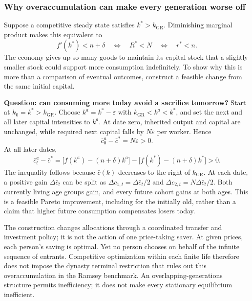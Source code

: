 \subsubsection{Why overaccumulation can make every generation worse off}

Suppose a competitive steady state satisfies $k^*>k_{\mathrm{GR}}$.
Diminishing marginal product makes this equivalent to
\begin{equation}\label{eq:olg-inefficiency}
f'(k^*)<n+\delta
\quad\Longleftrightarrow\quad R^*<N
\quad\Longleftrightarrow\quad r^*<n.
\end{equation}
The economy gives up so many goods to maintain its capital stock that a
slightly smaller stock could support more consumption indefinitely. To show
why this is more than a comparison of eventual outcomes, construct a feasible
change from the same initial capital.

\begin{redblock}
\textbf{Question: can consuming more today avoid a sacrifice tomorrow?}
Start at $k_0=k^*>k_{\mathrm{GR}}$. Choose $k^{a}=k^*-\varepsilon$
with $k_{\mathrm{GR}}<k^{a}<k^*$, and set the next and all later
capital intensities to $k^{a}$. At date zero, inherited output and
capital are unchanged, while required next capital falls by $N\varepsilon$
per worker. Hence
\[
\bar c^{a}_0-\bar c^*=N\varepsilon>0.
\]
At all later dates,
\[
\bar c^{a}_t-\bar c^*
=\big[f(k^{a})-(n+\delta)k^{a}\big]
 -\big[f(k^*)-(n+\delta)k^*\big]>0.
\]
The inequality follows because $\bar c(k)$ decreases to the right of
$k_{\mathrm{GR}}$. At each date, a positive gain $\Delta\bar c_t$ can be
split as $\Delta c_{1,t}=\Delta\bar c_t/2$ and
$\Delta c_{2,t}=N\Delta\bar c_t/2$. Both currently living age groups gain,
and every future cohort gains at both ages. This is a feasible Pareto
improvement, including for the initially old, rather than a claim that
higher future consumption compensates losers today.
\end{redblock}

The construction changes allocations through a coordinated transfer and
investment policy; it is not the action of one price-taking saver.
At given prices, each person's saving is optimal. Yet no person chooses
on behalf of the infinite sequence of entrants. Competitive optimization
within each finite life therefore does not impose the dynasty terminal
restriction that rules out this overaccumulation in the Ramsey benchmark.
An overlapping-generations structure permits inefficiency; it does not
make every stationary equilibrium inefficient.

